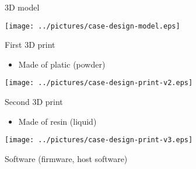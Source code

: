\documentclass[compress,red]{beamer}
\begin{document}
\begin{frame}{3D model}

  \begin{center}
    \texttt{[image: ../pictures/case-design-model.eps]}
  \end{center}

\end{frame}

\begin{frame}{First 3D print}

  \begin{itemize}
  \item Made of platic (powder)
  \end{itemize}

  \begin{center}
    \texttt{[image: ../pictures/case-design-print-v2.eps]}
  \end{center}

\end{frame}

\begin{frame}{Second 3D print}

  \begin{itemize}
  \item Made of resin (liquid)
  \end{itemize}

  \begin{center}
    \texttt{[image: ../pictures/case-design-print-v3.eps]}
  \end{center}

\end{frame}

\begin{frame}{Software (firmware, host software)}

  \begin{center}
  \end{center}

  \note[item]{}

\end{frame}


\end{document}
